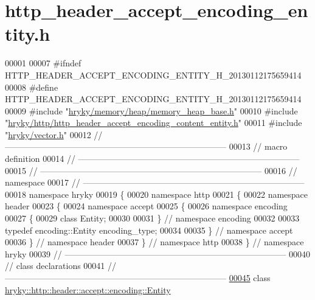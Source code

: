 \hypertarget{http__header__accept__encoding__entity_8h_source}{\section{http\-\_\-header\-\_\-accept\-\_\-encoding\-\_\-entity.\-h}
}

\begin{DoxyCode}
00001 
00007 \textcolor{preprocessor}{#ifndef HTTP\_HEADER\_ACCEPT\_ENCODING\_ENTITY\_H\_20130112175659414}
00008 \textcolor{preprocessor}{}\textcolor{preprocessor}{#define HTTP\_HEADER\_ACCEPT\_ENCODING\_ENTITY\_H\_20130112175659414}
00009 \textcolor{preprocessor}{}\textcolor{preprocessor}{#include "\hyperlink{memory__heap__base_8h}{hryky/memory/heap/memory_heap_base.h}"}
00010 \textcolor{preprocessor}{#include "\hyperlink{http__header__accept__encoding__content__entity_8h}{hryky/http/http_header_accept_encoding_content_entity.h}"}
00011 \textcolor{preprocessor}{#include "\hyperlink{vector_8h}{hryky/vector.h}"}
00012 \textcolor{comment}{//
      ------------------------------------------------------------------------------}
00013 \textcolor{comment}{// macro definition}
00014 \textcolor{comment}{//
      ------------------------------------------------------------------------------}
00015 \textcolor{comment}{//
      ------------------------------------------------------------------------------}
00016 \textcolor{comment}{// namespace}
00017 \textcolor{comment}{//
      ------------------------------------------------------------------------------}
00018 \textcolor{keyword}{namespace }hryky
00019 \{
00020 \textcolor{keyword}{namespace }http
00021 \{
00022 \textcolor{keyword}{namespace }header
00023 \{
00024 \textcolor{keyword}{namespace }accept
00025 \{
00026 \textcolor{keyword}{namespace }encoding
00027 \{
00029     \textcolor{keyword}{class }Entity;
00030 
00031 \} \textcolor{comment}{// namespace encoding}
00032 
00033 \textcolor{keyword}{typedef} encoding::Entity encoding\_type;
00034 
00035 \} \textcolor{comment}{// namespace accept}
00036 \} \textcolor{comment}{// namespace header}
00037 \} \textcolor{comment}{// namespace http}
00038 \} \textcolor{comment}{// namespace hryky}
00039 \textcolor{comment}{//
      ------------------------------------------------------------------------------}
00040 \textcolor{comment}{// class declarations}
00041 \textcolor{comment}{//
      ------------------------------------------------------------------------------}
\hypertarget{http__header__accept__encoding__entity_8h_source_l00045}{}\hyperlink{classhryky_1_1http_1_1header_1_1accept_1_1encoding_1_1_entity}{00045} \textcolor{comment}{}\textcolor{keyword}{class }\hyperlink{classhryky_1_1http_1_1header_1_1accept_1_1encoding_1_1_entity}{hryky::http::header::accept::encoding::Entity}

\end{DoxyCode}
